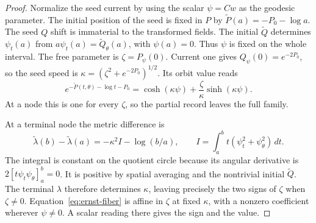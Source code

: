 \begin{proof}
Normalize the seed current by using the scalar
$\psi=Cw$ as the geodesic parameter.
The initial position of the seed is fixed in $P$ by
$\widetilde P(a)=-P_0-\log a$.
The seed $Q$ shift is immaterial to the transformed fields.
The initial $\widetilde Q$ determines $\psi_t(a)$ from
$a\psi_t(a)=\widetilde Q_\theta(a)$, with
$\psi(a)=0$. Thus $\psi$ is fixed on the whole interval.
The free parameter is $\zeta=P_\psi(0)$.
Current one gives $Q_\psi(0)=e^{-2P_0}$,
so the seed speed is
$\kappa=(\zeta^2+e^{-2P_0})^{1/2}$.
Its orbit value reads
\begin{equation}
 e^{-\widetilde P(t,\theta)-\log t-P_0}
  = \cosh(\kappa\psi)
       +\frac{\zeta}{\kappa}\sinh(\kappa\psi).
 \label{eq:ernst-fiber}
\end{equation}
At a node this is one for every $\zeta$, so the partial
record leaves the full family.

At a terminal node the metric difference is
\[
 \widetilde\lambda(b)-\widetilde\lambda(a)
   =-\kappa^2 I-\log(b/a),\qquad
 I=\int_a^b t(\psi_t^2+\psi_\theta^2)\,dt .
\]
The integral is constant on the quotient circle because
its angular derivative is $2[t\psi_t\psi_\theta]_a^b=0$.
It is positive by spatial averaging and the nontrivial
initial $\widetilde Q$. The terminal $\lambda$ therefore
determines $\kappa$, leaving precisely the two signs of
$\zeta$ when $\zeta\ne0$. Equation~\eqref{eq:ernst-fiber}
is affine in $\zeta$ at fixed $\kappa$, with a nonzero
coefficient wherever $\psi\ne0$. A scalar reading there
gives the sign and the value.
\end{proof}
